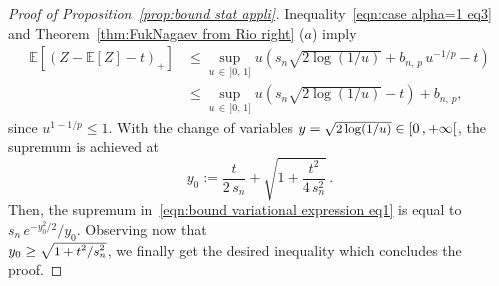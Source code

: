 \documentclass[AHL,Unicode,longabstracts,published]{cedram}
\newcommand{\bE}{\mathbb{E}}
\newcommand{\intervallefo}[2]{\mathopen{[} #1\mathclose{}\mathpunct{},#2\mathclose{[}}
\begin{document}
\begin{proof}[Proof of Proposition~\ref{prop:bound stat appli}]
Inequality~\eqref{eqn:case alpha=1 eq3} and Theorem~\ref{thm:FukNagaev from Rio right} ($a$) imply
\begin{equation}\label{eqn:bound variational expression eq1}
\begin{aligned}
\bE[(Z-\bE[Z]-t)_+]& \leq \sup_{u\,\in\,]0,\,1]} u\left(s_n\sqrt{2\log(1/u)}+b_{n,\,p}\,u^{-1/p} -t\right)\\\
&\leq \sup_{u\,\in\,]0,\,1]} u\left(s_n\sqrt{2\log(1/u)}-t\right)+b_{n,\,p},
\end{aligned}
\end{equation}
since $u^{1-1/p}\leq 1$. With the change of variables $y=\sqrt{\text{\small{$2\log(1/u)$}}}\in\intervallefo{0}{+\infty}$, the supremum is achieved at
\begin{equation}\label{eqn:bound variational expression eq2}
y_0:=\frac{t}{2\,s_n}+\sqrt{1+\frac{t^2}{4\,s_n^2}}\,.
\end{equation}
Then, the supremum in~\eqref{eqn:bound variational expression eq1} is equal to $s_n\,e^{-y_0^2/2}/y_0$. Observing now that\\ $y_0\geq \sqrt{\text{\small{$1+t^2/s_n^2$}}}$, we finally get the desired inequality which concludes the proof.
\end{proof}
\end{document}

